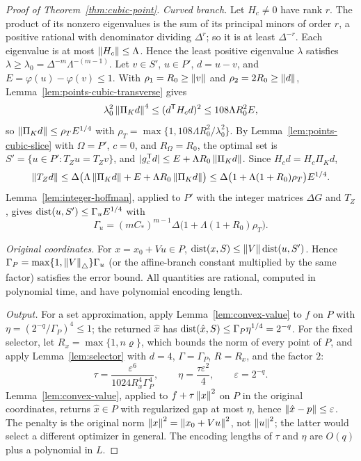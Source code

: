 \begin{proof}[Proof of Theorem~\ref{thm:cubic-point}]
\emph{Curved branch.} Let $H_c\ne0$ have rank $r$. The product of its
nonzero eigenvalues is the sum of its principal minors of order $r$, a
positive rational with denominator dividing $\Delta^r$; so it is at least
$\Delta^{-r}$. Each eigenvalue is at most $\left\lVert H_c\right\rVert\le\Lambda$. Hence the
least positive eigenvalue $\lambda$ satisfies
$\lambda\ge\lambda_0=\Delta^{-m}\Lambda^{-(m-1)}$. Let $v\in S'$, $u\in P'$,
$d=u-v$, and $E=\varphi(u)-\varphi(v)\le1$. With $\rho_1=R_0\ge\left\lVert v\right\rVert$
and $\rho_2=2R_0\ge\left\lVert d\right\rVert$, Lemma~\ref{lem:points-cubic-transverse} gives
\[
 \lambda_0^2\left\lVert\Pi_Kd\right\rVert^4\le(d^{\mathsf T}H_cd)^2\le108\Lambda R_0^2E,
\]
so $\left\lVert\Pi_Kd\right\rVert\le\rho_TE^{1/4}$ with
$\rho_T=\max\{1,108\Lambda R_0^2/\lambda_0^2\}$. By
Lemma~\ref{lem:points-cubic-slice} with $\Omega=P'$, $c=0$, and
$R_\Omega=R_0$, the optimal set is $S'=\{u\in P':T_Zu=T_Zv\}$, and
$|g_c^{\mathsf T}d|\le E+\Lambda R_0\left\lVert\Pi_Kd\right\rVert$. Since
$H_cd=H_c\Pi_Kd$,
\[
 \left\lVert T_Zd\right\rVert\le\Delta\bigl(\Lambda\left\lVert\Pi_Kd\right\rVert+E+\Lambda
 R_0\left\lVert\Pi_Kd\right\rVert\bigr)\le\Delta\bigl(1+\Lambda(1+R_0)\rho_T\bigr)E^{1/4}.
\]
Lemma~\ref{lem:integer-hoffman}, applied to $P'$ with the integer matrices
$\Delta G$ and $T_Z$, gives $\operatorname{dist}(u,S')\le\Gamma_uE^{1/4}$ with
\[
 \Gamma_u=(mC_*)^{m-1}\Delta\bigl(1+\Lambda(1+R_0)\rho_T\bigr).
\]

\emph{Original coordinates.} For $x=x_0+Vu\in P$,
$\operatorname{dist}(x,S)\le\left\lVert V\right\rVert\operatorname{dist}(u,S')$. Hence
$\Gamma_P=\max\{1,\left\lVert V\right\rVert_\triangle\}\Gamma_u$ (or the affine-branch
constant multiplied by the same factor) satisfies the error bound. All
quantities are rational, computed in polynomial time, and have polynomial
encoding length.

\emph{Output.} For a set approximation, apply Lemma~\ref{lem:convex-value} to
$f$ on $P$ with $\eta=(2^{-q}/\Gamma_P)^4\le1$; the returned $\hat x$ has
$\operatorname{dist}(\hat x,S)\le\Gamma_P\eta^{1/4}=2^{-q}$. For the fixed selector, let
$R_x=\max\{1,n\varrho\}$, which bounds the norm of every point of $P$, and
apply Lemma~\ref{lem:selector} with $d=4$, $\Gamma=\Gamma_P$, $R=R_x$, and the
factor $2$:
\[
 \tau=\frac{\varepsilon^6}{1024R_x^4\Gamma_P^4},\qquad
 \eta=\frac{\tau\varepsilon^2}4,\qquad\varepsilon=2^{-q}.
\]
Lemma~\ref{lem:convex-value}, applied to $f+\tau\left\lVert x\right\rVert^2$ on $P$ in the
original coordinates, returns $\hat x\in P$ with regularized gap at most
$\eta$, hence $\left\lVert\hat x-p\right\rVert\le\varepsilon$. The penalty is the original
norm $\left\lVert x\right\rVert^2=\left\lVert x_0+Vu\right\rVert^2$, not $\left\lVert u\right\rVert^2$; the latter would select
a different optimizer in general. The encoding lengths of $\tau$ and $\eta$
are $O(q)$ plus a polynomial in $L$.
\end{proof}


